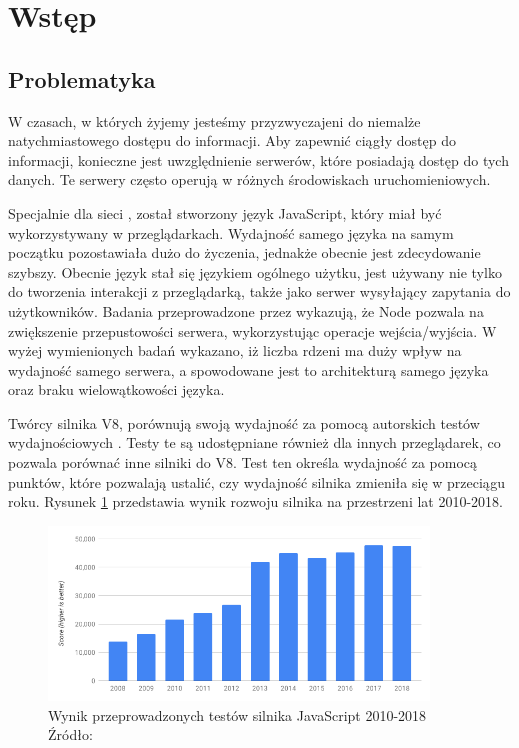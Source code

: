 \section{Wstęp}
\subsection{Problematyka}
W czasach, w których żyjemy jesteśmy przyzwyczajeni do niemalże natychmiastowego dostępu do informacji. Aby zapewnić ciągły dostęp do informacji, konieczne jest uwzględnienie serwerów, które posiadają dostęp do tych danych. Te serwery często operują w różnych środowiskach uruchomieniowych.

Specjalnie dla sieci , został stworzony język JavaScript, który miał być wykorzystywany w przeglądarkach. Wydajność samego języka na samym początku pozostawiała dużo do życzenia, jednakże obecnie jest zdecydowanie szybszy. Obecnie język stał się językiem ogólnego użytku, jest używany nie tylko do tworzenia interakcji z przeglądarką, także jako serwer wysyłający zapytania  do użytkowników. Badania przeprowadzone przez \cite{comparison_of_servers} wykazują, że Node pozwala na zwiększenie przepustowości serwera, wykorzystując operacje wejścia/wyjścia. W wyżej wymienionych badań wykazano, iż liczba rdzeni ma duży wpływ na wydajność samego serwera, a spowodowane jest to architekturą samego języka oraz braku wielowątkowości języka. 

Twórcy silnika V8, porównują swoją wydajność za pomocą autorskich testów wydajnościowych \cite{ten_years_of_v8_chromium} \cite{ten_years_of_v8}. Testy te są udostępniane również dla innych przeglądarek, co pozwala porównać inne silniki do V8. Test ten określa wydajność za pomocą punktów, które pozwalają ustalić, czy wydajność silnika zmieniła się w przeciągu roku. Rysunek \ref{fig:performance_v8} przedstawia wynik rozwoju silnika na przestrzeni lat 2010-2018.

\begin{figure}[h]
  \centering
  \includegraphics[width=0.9\textwidth]{Figures/v8_bench_2010_2018.png}
  \caption{Wynik przeprowadzonych testów silnika JavaScript 2010-2018 Źródło: \cite{ten_years_of_v8_chromium}}
  \label{fig:performance_v8}
\end{figure}

